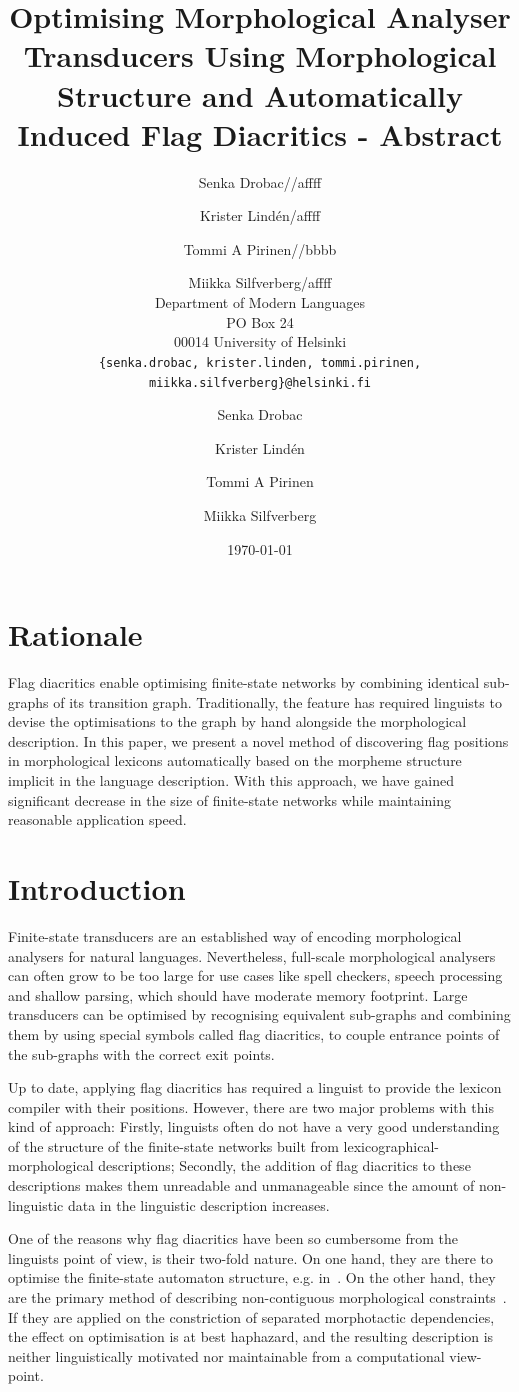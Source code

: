 \documentclass[11pt]{article}
\title{Optimising Morphological Analyser Transducers Using Morphological Structure
and Automatically Induced Flag Diacritics - Abstract}
\author{Senka Drobac//affff \and Krister Lind\'{e}n/affff \and Tommi A Pirinen//bbbb \and Miikka Silfverberg/affff  \\
Department of Modern Languages \\
PO Box 24 \\
00014 University of Helsinki \\
{\tt \{senka.drobac, krister.linden, tommi.pirinen, miikka.silfverberg\}@helsinki.fi}}
\institute{bla}
\author[1]{Senka Drobac}
\author[1]{Krister Lind\'{e}n}
\author[2]{Tommi A Pirinen}
\author[1]{Miikka Silfverberg}
\affil[1]{Department of Modern Languages, PO Box 24, 00014 University of Helsinki}
\affil[2]{Department of Speech Sciences, PO Box 9, 00014 University of Helsinki}
\date{\today}
\begin{document}
\maketitle

\section{Rationale}

    Flag diacritics enable optimising finite-state networks by
    combining identical sub-graphs of its transition
    graph. Traditionally, the feature has required linguists to devise
    the optimisations to the graph by hand alongside the morphological
    description. In this paper, we present a novel method of
    discovering flag positions in morphological lexicons automatically
    based on the morpheme structure implicit in the language
    description. With this approach, we have gained significant
    decrease in the size of finite-state networks while maintaining reasonable application speed.

\section{Introduction}

Finite-state transducers are an established way of encoding
morphological analysers for natural languages. Nevertheless,
full-scale morphological analysers can often grow to be too large for
use cases like spell checkers, speech processing and shallow parsing, which 
should have moderate memory footprint. Large transducers can be optimised by recognising
equivalent sub-graphs and combining them by using special symbols called
flag diacritics, to couple entrance points of the sub-graphs with the
correct exit points.

Up to date, applying flag diacritics has required a linguist to provide
the lexicon compiler with their positions. However, there are two
major problems with this kind of approach: Firstly, linguists often do
not have a very good understanding of the structure of the
finite-state networks built from lexicographical-morphological
descriptions; Secondly, the addition of flag diacritics to these
descriptions makes them unreadable and unmanageable since the amount
of non-linguistic data in the linguistic description increases. 

One of the reasons why flag diacritics have been so cumbersome from
the linguists point of view, is their two-fold nature. On one hand,
they are there to optimise the finite-state automaton structure,
e.g. in~\cite{karttunen2006numbers}. On the other hand, they are the
primary method of describing non-contiguous morphological
constraints~\cite{beesley1998constraining}. If they are applied on the
constriction of separated morphotactic dependencies, the effect on
optimisation is at best haphazard, and the resulting description is
neither linguistically motivated nor maintainable from a computational
view-point.
\end{document}
